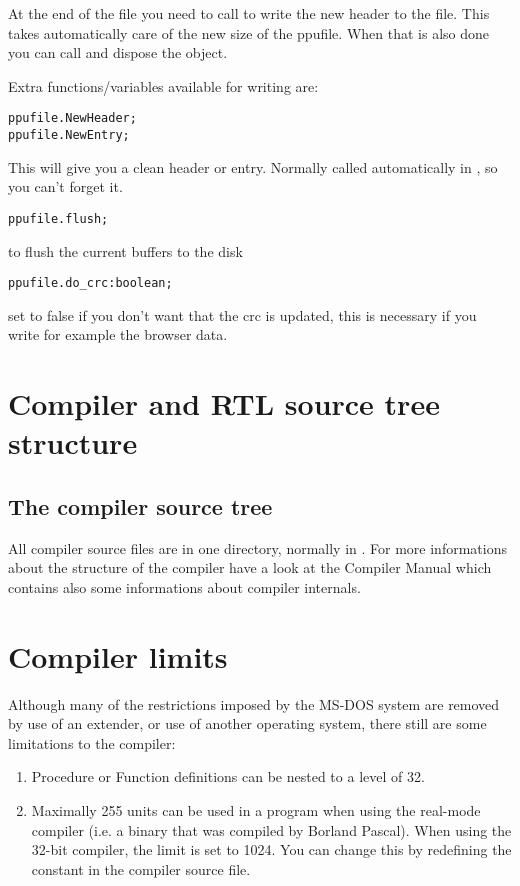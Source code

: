 \documentclass{report}
\begin{document}
At the end of the file you need to call  to write the
new header to the file. This takes automatically care of the new size of the
ppufile. When that is also done you can call  and dispose the
object.

Extra functions/variables available for writing are:
\begin{verbatim}
ppufile.NewHeader;
ppufile.NewEntry;
\end{verbatim}
This will give you a clean header or entry. Normally called automatically
in , so you can't forget it.
\begin{verbatim}
ppufile.flush;
\end{verbatim}

to flush the current buffers to the disk
\begin{verbatim}
ppufile.do_crc:boolean;
\end{verbatim}
set to false if you don't want that the crc is updated, this is necessary
if you write for example the browser data.


\chapter{Compiler and RTL source tree structure}
\label{ch:AppB}

\section{The compiler source tree}

All compiler source files are in one directory, normally in
. For more informations
about the structure of the compiler have a look at the
Compiler Manual which contains also some informations about
compiler internals.


\chapter{Compiler limits}
\label{ch:AppC}
Although many of the restrictions imposed by the MS-DOS system are removed
by use of an extender, or use of another operating system, there still are
some limitations to the compiler:
\begin{enumerate}
\item Procedure or Function definitions can be nested to a level of 32.
\item Maximally 255 units can be used in a program when using the real-mode
compiler (i.e. a binary that was compiled by Borland Pascal). When using the 32-bit compiler, the limit is set to 1024. You can
change this by redefining the  constant in the
 compiler source file.
\end{enumerate}
\end{document}
